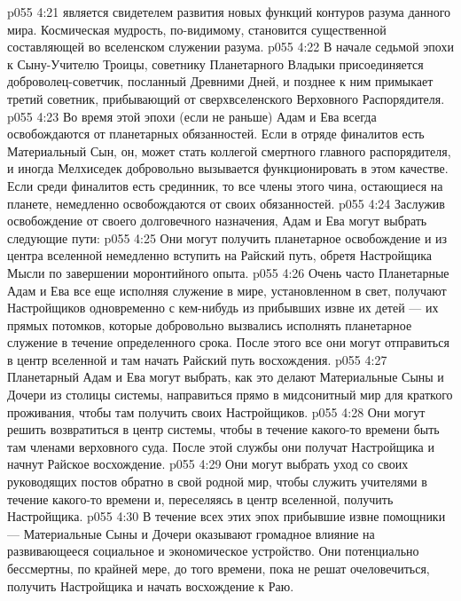 \vs p055 4:21 \bibnobreakspace {} является свидетелем развития новых функций контуров разума данного мира. Космическая мудрость, по\hyp{}видимому, становится существенной составляющей во вселенском служении разума.
\vs p055 4:22 \bibnobreakspace {} В начале седьмой эпохи к Сыну\hyp{}Учителю Троицы, советнику Планетарного Владыки присоединяется доброволец\hyp{}советчик, посланный Древними Дней, и позднее к ним примыкает третий советник, прибывающий от сверхвселенского Верховного Распорядителя.
\vs p055 4:23 Во время этой эпохи (если не раньше) Адам и Ева всегда освобождаются от планетарных обязанностей. Если в отряде финалитов есть Материальный Сын, он, может стать коллегой смертного главного распорядителя, и иногда Мелхиседек добровольно вызывается функционировать в этом качестве. Если среди финалитов есть срединник, то все члены этого чина, остающиеся на планете, немедленно освобождаются от своих обязанностей.
\vs p055 4:24 \pc Заслужив освобождение от своего долговечного назначения, Адам и Ева могут выбрать следующие пути:
\vs p055 4:25 \bibnobreakspace Они могут получить планетарное освобождение и из центра вселенной немедленно вступить на Райский путь, обретя Настройщика Мысли по завершении моронтийного опыта.
\vs p055 4:26 \bibnobreakspace Очень часто Планетарные Адам и Ева все еще исполняя служение в мире, установленном в свет, получают Настройщиков одновременно с кем\hyp{}нибудь из прибывших извне их детей --- их прямых потомков, которые добровольно вызвались исполнять планетарное служение в течение определенного срока. После этого все они могут отправиться в центр вселенной и там начать Райский путь восхождения.
\vs p055 4:27 \bibnobreakspace Планетарный Адам и Ева могут выбрать, как это делают Материальные Сыны и Дочери из столицы системы, направиться прямо в мидсонитный мир для краткого проживания, чтобы там получить своих Настройщиков.
\vs p055 4:28 \bibnobreakspace Они могут решить возвратиться в центр системы, чтобы в течение какого\hyp{}то времени быть там членами верховного суда. После этой службы они получат Настройщика и начнут Райское восхождение.
\vs p055 4:29 \bibnobreakspace Они могут выбрать уход со своих руководящих постов обратно в свой родной мир, чтобы служить учителями в течение какого\hyp{}то времени и, переселяясь в центр вселенной, получить Настройщика.
\vs p055 4:30 \pc В течение всех этих эпох прибывшие извне помощники --- Материальные Сыны и Дочери оказывают громадное влияние на развивающееся социальное и экономическое устройство. Они потенциально бессмертны, по крайней мере, до того времени, пока не решат очеловечиться, получить Настройщика и начать восхождение к Раю.
